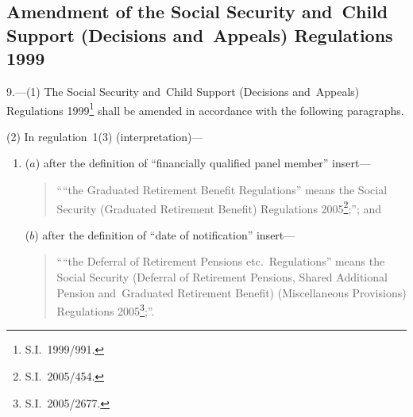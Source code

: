 \documentclass[12pt,a4paper]{article}
\begin{document}
\subsection[9. Amendment of the Social Security and~Child Support (Decisions and~Appeals) Regulations 1999]{Amendment of the Social Security and~Child Support (Decisions and~Appeals) Regulations 1999}

9.---(1)  The Social Security and~Child Support (Decisions and~Appeals) Regulations 1999\footnote{S.I.~1999/991.} shall be amended in accordance with the following paragraphs.

(2) In regulation~1(3) (interpretation)—
\begin{enumerate}\item[]
($a$) after the definition of “financially qualified panel member” insert—
\begin{quotation}
““the Graduated Retirement Benefit Regulations” means the Social Security (Graduated Retirement Benefit) Regulations 2005\footnote{S.I.~2005/454.};”; and
\end{quotation}

($b$) after the definition of “date of notification” insert—
\begin{quotation}
““the Deferral of Retirement Pensions etc.\ Regulations” means the Social Security (Deferral of Retirement Pensions, Shared Additional Pension and~Graduated Retirement Benefit) (Miscellaneous Provisions) Regulations 2005\footnote{S.I.~2005/2677.};”.
\end{quotation}
\end{enumerate}
\end{document}
